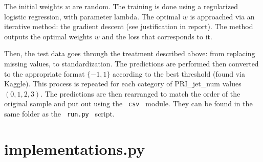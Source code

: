 \documentclass[11pt, oneside]{article}   	%
\begin{document}
The initial weights $w$ are random. The training is done using a regularized logistic regression, with parameter lambda. The optimal $w$ is approached via an iterative method: the gradient descent (see justification in report). The method outputs the optimal weights $w$ and the loss that corresponds to it.

Then, the test data goes through the treatment described above: from replacing missing values, to standardization. The predictions are performed then converted to the appropriate format $ \{ -1, 1 \}$ according to the best threshold (found via Kaggle). This process is repeated for each category of PRI\_jet\_num values $(0,1,2,3)$. The predictions are then rearranged to match the order of the original sample and put out using the \lstinline" csv " module. They can be found in the same folder as the \lstinline" run.py " script.

\section{implementations.py}
\end{document}
